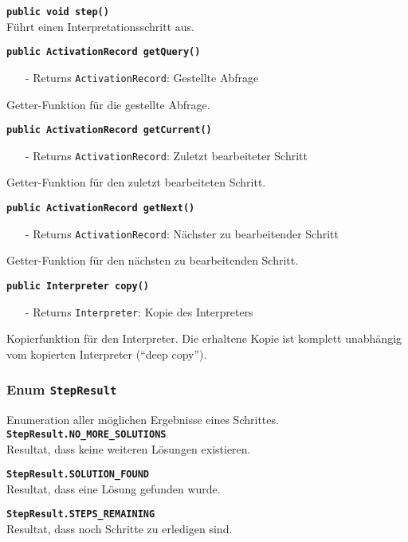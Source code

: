 \documentclass[parskip=full,11pt,twoside]{scrartcl}
\begin{document}
\textbf{\texttt{public void step()}}\\
Führt einen Interpretationsschritt aus.

\textbf{\texttt{public ActivationRecord getQuery()}}
\begin{itemize}[noitemsep]
	\item[-] Returns \texttt{ActivationRecord}: Gestellte Abfrage
\end{itemize}
Getter-Funktion für die gestellte Abfrage.

\textbf{\texttt{public ActivationRecord getCurrent()}}
\begin{itemize}[noitemsep]
	\item[-] Returns \texttt{ActivationRecord}: Zuletzt bearbeiteter Schritt
\end{itemize}
Getter-Funktion für den zuletzt bearbeiteten Schritt.

\textbf{\texttt{public ActivationRecord getNext()}}
\begin{itemize}[noitemsep]
	\item[-] Returns \texttt{ActivationRecord}: Nächster zu bearbeitender Schritt
\end{itemize}
Getter-Funktion für den nächsten zu bearbeitenden Schritt.

\textbf{\texttt{public Interpreter copy()}}
\begin{itemize}[noitemsep]
	\item[-] Returns \texttt{Interpreter}: Kopie des Interpreters
\end{itemize}
Kopierfunktion für den Interpreter. Die erhaltene Kopie ist komplett unabhängig vom kopierten Interpreter (\enquote{deep copy}).

\subsubsection{Enum \texttt{StepResult}}
Enumeration aller möglichen Ergebnisse eines Schrittes.\\

\textbf{\texttt{StepResult.NO\_MORE\_SOLUTIONS}}\\
Resultat, dass keine weiteren Lösungen existieren.

\textbf{\texttt{StepResult.SOLUTION\_FOUND}}\\
Resultat, dass eine Lösung gefunden wurde.

\textbf{\texttt{StepResult.STEPS\_REMAINING}}\\
Resultat, dass noch Schritte zu erledigen sind.
\end{document}
